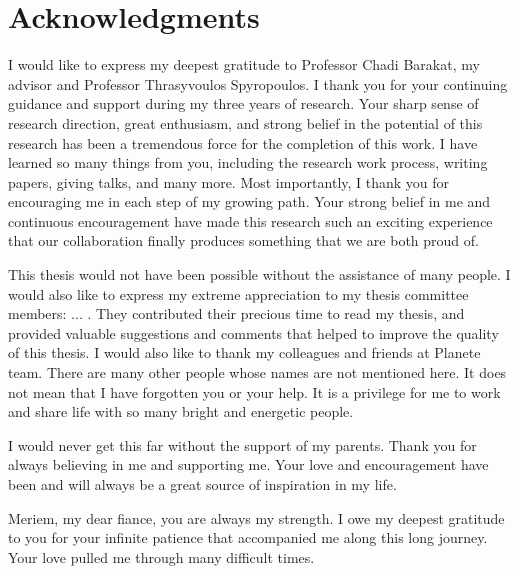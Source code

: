 \documentclass[a4paper,11pt,twoside]{ThesisStyle}
\begin{document}


\dominitoc


 \cleardoublepage

\section*{Acknowledgments}

I would like to express my deepest gratitude to Professor Chadi Barakat, my advisor and Professor Thrasyvoulos Spyropoulos. I thank you for your continuing guidance and support during my three years of research. Your sharp sense of research direction, great enthusiasm, and strong belief in the potential of this research has been a tremendous force for the completion of this work. I have learned so many things from you, including the research work process, writing papers, giving talks, and many more. Most importantly, I thank you for encouraging me in each step of my growing path. Your strong belief in me and continuous encouragement have made this research such an exciting experience that our collaboration finally produces something that we are both proud of.

This thesis would not have been possible without the assistance of many people. I would also like to express my extreme appreciation to my thesis committee members: ... . They contributed their precious time to read my thesis, and provided valuable suggestions and comments that helped to improve the quality of this thesis. I would also like to thank my colleagues and friends at Planete team. There are many other people whose names are not mentioned here. It does not mean that I have forgotten you or your help. It is a privilege for me to work and share life with so many bright and energetic people. 

I would never get this far without the support of my parents. Thank you for always believing in me and supporting me. Your love and encouragement have been and will always be a great source of inspiration in my life.  

Meriem, my dear fiance, you are always my strength. I owe my deepest gratitude to you for your infinite patience that accompanied me along this long journey. Your love pulled me through many difficult times. 

\tableofcontents

\mainmatter








\end{document}
